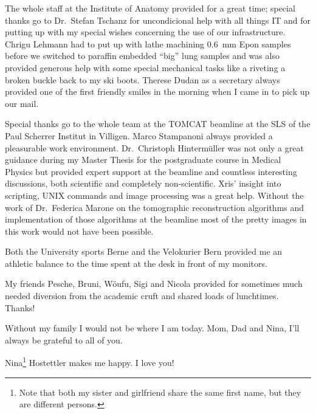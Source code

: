 The whole staff at the Institute of Anatomy provided for a great time; special thanks go to Dr.\ Stefan Tschanz for uncondicional help with all things IT and for putting up with my special wishes concerning the use of our infrastructure. Chrigu Lehmann had to put up with lathe machining \SI{0.6}{\milli\meter} Epon samples before we switched to paraffin embedded ``big'' lung samples and was also provided generous help with some special mechanical tasks like a riveting a broken buckle back to my ski boots. Therese Dudan as a secretary always provided one of the first friendly smiles in the morning when I came in to pick up our mail.

Special thanks go to the whole team at the \acs{TOMCAT} beamline at the \acl{SLS} of the Paul Scherrer Institut in Villigen. Marco Stampanoni always provided a pleasurable work environment. Dr.\ Christoph Hintermüller was not only a great guidance during my Master Thesis for the postgraduate course in Medical Physics but provided expert support at the beamline and countless interesting discussions, both scientific and completely non-scientific. Xris' insight into scripting, UNIX commands and image processing was a great help. Without the work of Dr.\ Federica Marone on the tomographic reconstruction algorithms and implementation of those algorithms at the beamline most of the pretty images in this work would not have been possible.

Both the University sports Berne and the Velokurier Bern provided me an athletic balance to the time spent at the desk in front of my monitors.

My friends Pesche, Bruni, Wöufu, Sigi and Nicola provided for sometimes much needed diversion from the academic cruft and shared loads of lunchtimes. Thanks!

Without my family I would not be where I am today. Mom, Dad and Nina, I'll always
be grateful to all of you.

Nina\footnote{Note that both my sister and girlfriend share the same first name, but they are different persons.} Hostettler makes me happy. I love you!
\endgroup